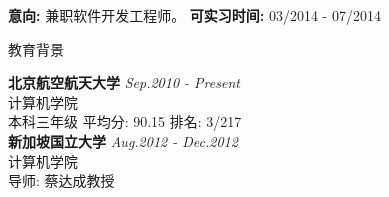 \documentclass{resume} %
\begin{document}
{\bf 意向: }兼职软件开发工程师。
{\bf 可实习时间: }03/2014 - 07/2014


\begin{rSection}{教育背景}

{\bf 北京航空航天大学} \hfill {\em Sep.2010 - Present} \\ 
计算机学院 \\
本科三年级 平均分: 90.15 排名: 3/217\\
{\bf 新加坡国立大学} \hfill {\em Aug.2012 - Dec.2012} \\
计算机学院 \\
导师: 蔡达成教授

\end{rSection}

\end{document}
